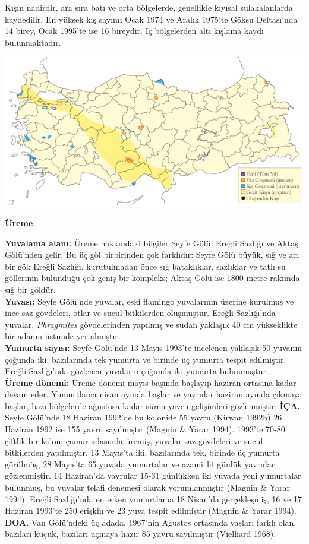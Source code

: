 \documentclass[
  letterpaper,
  DIV=11,
  numbers=noendperiod]{scrreprt}
\begin{document}
Kışın nadirdir, ara sıra batı ve orta bölgelerde, genellikle kıyısal
sulakalanlarda kaydedilir. En yüksek kış sayımı Ocak 1974 ve Aralık
1975'te Göksu Deltası'nda 14 birey, Ocak 1995'te ise 16 bireydir. İç
bölgelerden altı kışlama kaydı bulunmaktadır.

\includegraphics{images/harita_Page_073.png}

\textbf{Üreme}

\textbf{Yuvalama alanı:} Üreme hakkındaki bilgiler Seyfe Gölü, Ereğli
Sazlığı ve Aktaş Gölü'nden gelir. Bu üç göl birbirinden çok farklıdır:
Seyfe Gölü büyük, sığ ve acı bir göl; Ereğli Sazlığı, kurutulmadan önce
sığ bataklıklar, sazlıklar ve tatlı su göllerinin bulunduğu çok geniş
bir kompleks; Aktaş Gölü ise 1800 metre rakımda sığ bir göldür.\\
\textbf{Yuvası:} Seyfe Gölü'nde yuvalar, eski flamingo yuvalarının
üzerine kurulmuş ve ince saz gövdeleri, otlar ve sucul bitkilerden
oluşmuştur. Ereğli Sazlığı'nda yuvalar, \emph{Phragmites} gövdelerinden
yapılmış ve sudan yaklaşık 40 cm yükseklikte bir adanın üstünde yer
almıştır.\\
\textbf{Yumurta sayısı:} Seyfe Gölü'nde 13 Mayıs 1993'te incelenen
yaklaşık 50 yuvanın çoğunda iki, bazılarında tek yumurta ve birinde üç
yumurta tespit edilmiştir. Ereğli Sazlığı'nda gözlenen yuvaların çoğunda
iki yumurta bulunmuştur.\\
\textbf{Üreme dönemi:} Üreme dönemi mayıs başında başlayıp haziran
ortasına kadar devam eder. Yumurtlama nisan ayında başlar ve yavrular
haziran ayında çıkmaya başlar, bazı bölgelerde ağustosa kadar süren
yavru gelişimleri gözlenmiştir. \textbf{İÇA.} Seyfe Gölü'nde 18 Haziran
1992'de bu kolonide 55 yavru (Kirwan 1992b) 26 Haziran 1992 ise 155
yavru sayılmıştır (Magnin \& Yarar 1994). 1993'te 70-80 çiftlik bir
koloni çamur adasında üremiş, yuvalar saz gövdeleri ve sucul bitkilerden
yapılmıştır. 13 Mayıs'ta iki, bazılarında tek, birinde üç yumurta
görülmüş, 28 Mayıs'ta 65 yuvada yumurtalar ve azami 14 günlük yavrular
gözlenmiştir. 14 Haziran'da yavrular 15-31 günlükken iki yuvada yeni
yumurtalar bulunmuş, bu yuvalar telafi denemesi olarak yorumlanmıştır
(Magnin \& Yarar 1994). Ereğli Sazlığı'nda en erken yumurtlama 18
Nisan'da gerçekleşmiş, 16 ve 17 Haziran 1993'te 250 erişkin ve 23 yuva
tespit edilmiştir (Magnin \& Yarar 1994). \textbf{DOA}. Van Gölü'ndeki
üç adada, 1967'nin Ağustos ortasında yaşları farklı olan, bazıları
küçük, bazıları uçmaya hazır 85 yavru sayılmıştır (Vielliard 1968).
\end{document}
